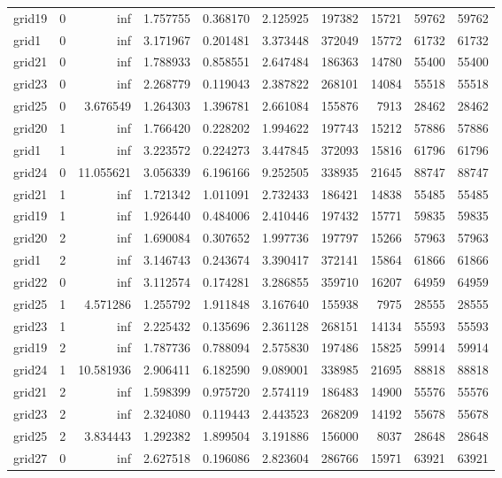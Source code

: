 \begin{longtable}{|l|r|r|r|r|r|r|r|r|r|}
grid19 & 0 & inf & 1.757755 & 0.368170 & 2.125925 & 197382 & 15721 & 59762 & 59762 \\
grid1 & 0 & inf & 3.171967 & 0.201481 & 3.373448 & 372049 & 15772 & 61732 & 61732 \\
grid21 & 0 & inf & 1.788933 & 0.858551 & 2.647484 & 186363 & 14780 & 55400 & 55400 \\
grid23 & 0 & inf & 2.268779 & 0.119043 & 2.387822 & 268101 & 14084 & 55518 & 55518 \\
grid25 & 0 & 3.676549 & 1.264303 & 1.396781 & 2.661084 & 155876 & 7913 & 28462 & 28462 \\
grid20 & 1 & inf & 1.766420 & 0.228202 & 1.994622 & 197743 & 15212 & 57886 & 57886 \\
grid1 & 1 & inf & 3.223572 & 0.224273 & 3.447845 & 372093 & 15816 & 61796 & 61796 \\
grid24 & 0 & 11.055621 & 3.056339 & 6.196166 & 9.252505 & 338935 & 21645 & 88747 & 88747 \\
grid21 & 1 & inf & 1.721342 & 1.011091 & 2.732433 & 186421 & 14838 & 55485 & 55485 \\
grid19 & 1 & inf & 1.926440 & 0.484006 & 2.410446 & 197432 & 15771 & 59835 & 59835 \\
grid20 & 2 & inf & 1.690084 & 0.307652 & 1.997736 & 197797 & 15266 & 57963 & 57963 \\
grid1 & 2 & inf & 3.146743 & 0.243674 & 3.390417 & 372141 & 15864 & 61866 & 61866 \\
grid22 & 0 & inf & 3.112574 & 0.174281 & 3.286855 & 359710 & 16207 & 64959 & 64959 \\
grid25 & 1 & 4.571286 & 1.255792 & 1.911848 & 3.167640 & 155938 & 7975 & 28555 & 28555 \\
grid23 & 1 & inf & 2.225432 & 0.135696 & 2.361128 & 268151 & 14134 & 55593 & 55593 \\
grid19 & 2 & inf & 1.787736 & 0.788094 & 2.575830 & 197486 & 15825 & 59914 & 59914 \\
grid24 & 1 & 10.581936 & 2.906411 & 6.182590 & 9.089001 & 338985 & 21695 & 88818 & 88818 \\
grid21 & 2 & inf & 1.598399 & 0.975720 & 2.574119 & 186483 & 14900 & 55576 & 55576 \\
grid23 & 2 & inf & 2.324080 & 0.119443 & 2.443523 & 268209 & 14192 & 55678 & 55678 \\
grid25 & 2 & 3.834443 & 1.292382 & 1.899504 & 3.191886 & 156000 & 8037 & 28648 & 28648 \\
grid27 & 0 & inf & 2.627518 & 0.196086 & 2.823604 & 286766 & 15971 & 63921 & 63921 \\

\end{longtable}
